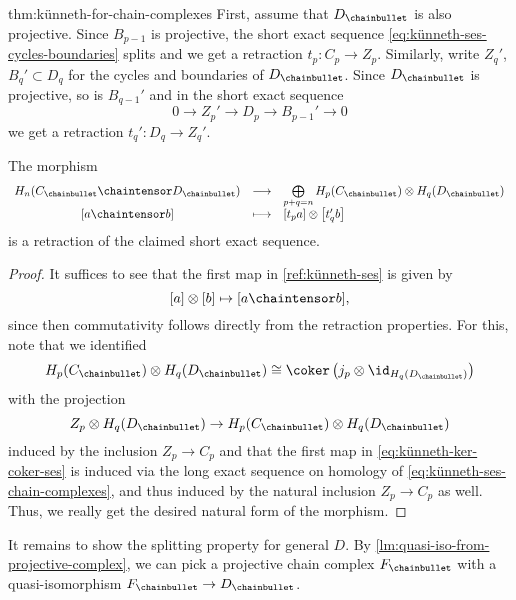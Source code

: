 \begin{refproof}{thm:künneth-for-chain-complexes}
  First, assume that $D_\chainbullet $ is also projective.
  Since $B_{p-1}$ is projective, the short exact sequence
  \eqref{eq:künneth-ses-cycles-boundaries}
  splits and we get a retraction
  $t_p \colon  C_p \to  Z_p$.
  Similarly, write $Z_q'$,  $B_q'\subset D_q$ for the cycles
  and boundaries of $D_\chainbullet $.
  Since $D_\chainbullet $ is projective, so is $B_{q-1}'$
  and in the short exact sequence
  \[
    0 \to  Z_p' \to  D_p \to B_{p-1}' \to 0
  \]
  we get a retraction $t_q' \colon  D_q \to Z_q'$.
  \begin{claim}
    The morphism
      \begin{equation*}
      \begin{array}{c c l} 
      H_n(C_\chainbullet \chaintensor D_\chainbullet )
      &
      \longrightarrow
      &
      \directsum\limits_{p+q=n}H_p(C_\chainbullet ) \tensor H_q(D_\chainbullet )
      \\
      \left[ a \chaintensor b\right]
      &
      \longmapsto
      &
      \left[t_p a\right] \tensor \left[t_q'b\right]
      \end{array}
    \end{equation*}
    is a retraction of the claimed short exact sequence.
  \end{claim}
  \begin{proof}
    It suffices to see that the first map in
    \eqref{ref:künneth-ses} is given by
    \[
      [ a ] \tensor [b] \mapsto [ a \chaintensor  b ]
    ,\]
    since then commutativity follows directly from the retraction properties.
    For this, note that we identified
    \[
      H_p(C_\chainbullet ) \tensor H_q(D_\chainbullet )
      \cong
      \coker \left( j_p \tensor \id_{H_q(D_\chainbullet )} \right) 
    \]
    with the projection
    \[
      Z_p \tensor H_q(D_\chainbullet ) \to H_p(C_\chainbullet ) \tensor H_q(D_\chainbullet )
    \]
    induced by the inclusion $Z_p \to C_p$
    and that the first map in
    \eqref{eq:künneth-ker-coker-ses}
    is induced via the long exact sequence on homology of
    \eqref{eq:künneth-ses-chain-complexes},
    and thus induced by the natural inclusion $Z_p \to  C_p$
    as well.
    Thus, we really get the desired natural form of the morphism.
  \end{proof}

  It remains to show the splitting property for general $D$.
  By
  \autoref{lm:quasi-iso-from-projective-complex},
  we can pick a projective chain complex $F_\chainbullet $
  with a quasi-isomorphism $F_\chainbullet \to D_\chainbullet$.


\end{refproof}
